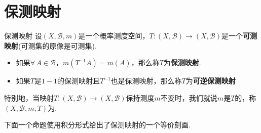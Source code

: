 \section{保测映射}

\begin{definition}{保测映射}
    设$(X,\mathcal{B},m)$是一个概率测度空间，$T:(X,\mathcal{B}) \to (X,\mathcal{B})$是一个\textbf{可测映射}(可测集的原像是可测集).
    \begin{itemize}
        \item 如果$\forall\, A\in\mathcal{B}$，$m(T^{-1}A)=m(A)$，那么称$T$为\textbf{保测映射}.
        \item 如果$T$是$1-1$的保测映射且$T^{-1}$也是保测映射，那么称$T$为\textbf{可逆保测映射}
    \end{itemize}
\end{definition}
特别地，当映射$T:(X,\mathcal{B}) \to (X,\mathcal{B})$保持测度$m$不变时，我们就说$m$是$T$的，称$(X,\mathcal{B},m,T)$为.\par
下面一个命题使用积分形式给出了保测映射的一个等价刻画.


